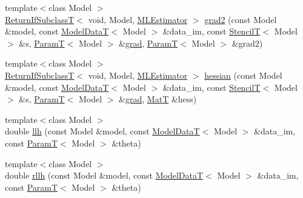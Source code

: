 \begin{DoxyCompactItemize}
\item 
{\footnotesize template$<$class Model $>$ }\\\hyperlink{namespacemappel_a3b77d227658ba3ba9e16fea6fa6e626d}{Return\+If\+SubclassT}$<$ void, Model, \hyperlink{classmappel_1_1MLEstimator}{M\+L\+Estimator} $>$ \hyperlink{namespacemappel_1_1methods_1_1objective_a7bf5acef5f9edd9ddf2c47cb5a90e8db}{grad2} (const Model \&model, const \hyperlink{namespacemappel_a97f050df953605381ae9c901c3b125f1}{Model\+DataT}$<$ Model $>$ \&data\+\_\+im, const \hyperlink{namespacemappel_a3a06598240007876f8c4bf834ad86197}{StencilT}$<$ Model $>$ \&s, \hyperlink{namespacemappel_a667925cb0d6c0e49f2f035cc5a9a6857}{ParamT}$<$ Model $>$ \&\hyperlink{namespacemappel_1_1methods_1_1objective_a8e120e5a79029803453cea5f9f2d8f67}{grad}, \hyperlink{namespacemappel_a667925cb0d6c0e49f2f035cc5a9a6857}{ParamT}$<$ Model $>$ \&grad2)
\item 
{\footnotesize template$<$class Model $>$ }\\\hyperlink{namespacemappel_a3b77d227658ba3ba9e16fea6fa6e626d}{Return\+If\+SubclassT}$<$ void, Model, \hyperlink{classmappel_1_1MLEstimator}{M\+L\+Estimator} $>$ \hyperlink{namespacemappel_1_1methods_1_1objective_ad7242f889fcefed1ec11c238cd3d22e3}{hessian} (const Model \&model, const \hyperlink{namespacemappel_a97f050df953605381ae9c901c3b125f1}{Model\+DataT}$<$ Model $>$ \&data\+\_\+im, const \hyperlink{namespacemappel_a3a06598240007876f8c4bf834ad86197}{StencilT}$<$ Model $>$ \&s, \hyperlink{namespacemappel_a667925cb0d6c0e49f2f035cc5a9a6857}{ParamT}$<$ Model $>$ \&\hyperlink{namespacemappel_1_1methods_1_1objective_a8e120e5a79029803453cea5f9f2d8f67}{grad}, \hyperlink{namespacemappel_a7091ab87c528041f7e2027195fad8915}{MatT} \&hess)
\item 
{\footnotesize template$<$class Model $>$ }\\double \hyperlink{namespacemappel_1_1methods_1_1objective_a6f6dafac3df60b7d1c1dfa1eb7491eb8}{llh} (const Model \&model, const \hyperlink{namespacemappel_a97f050df953605381ae9c901c3b125f1}{Model\+DataT}$<$ Model $>$ \&data\+\_\+im, const \hyperlink{namespacemappel_a667925cb0d6c0e49f2f035cc5a9a6857}{ParamT}$<$ Model $>$ \&theta)
\item 
{\footnotesize template$<$class Model $>$ }\\double \hyperlink{namespacemappel_1_1methods_1_1objective_ae5d28913a8f6ce2c042edd810cb17e13}{rllh} (const Model \&model, const \hyperlink{namespacemappel_a97f050df953605381ae9c901c3b125f1}{Model\+DataT}$<$ Model $>$ \&data\+\_\+im, const \hyperlink{namespacemappel_a667925cb0d6c0e49f2f035cc5a9a6857}{ParamT}$<$ Model $>$ \&theta)

\end{DoxyCompactItemize}
